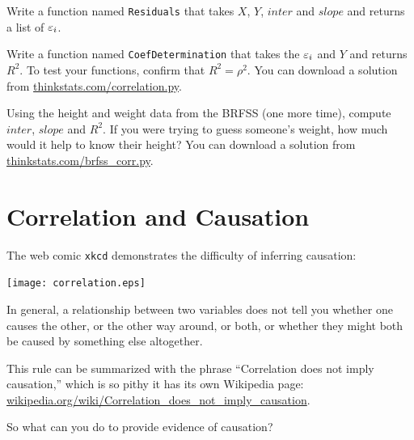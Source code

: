 \documentclass[12pt]{book}
\begin{document}
\begin{ex}

Write a function named {\tt Residuals} that takes $X$, $Y$, $inter$
and $slope$ and returns a list of $\varepsilon_i$.

Write a function named {\tt CoefDetermination} that takes the $\varepsilon_i$
and $Y$ and returns $R^2$.  To test your functions, confirm that $R^2
= \rho^2$.  You can download a solution
from \url{thinkstats.com/correlation.py}.

\end{ex}

\begin{ex}

Using the height and weight data from the BRFSS (one more time),
compute $inter$, $slope$ and $R^2$.  If you were trying to guess
someone's weight, how much would it help to know their height?
You can download a solution from
\url{thinkstats.com/brfss_corr.py}.

\end{ex}


\section{Correlation and Causation}

The web comic {\tt xkcd} demonstrates the difficulty of inferring
causation:

\vspace{0.1in}
\centerline{\texttt{[image: correlation.eps]}}

In general, a relationship between two variables does not tell you
whether one causes the other, or the other way around, or both, or
whether they might both be caused by something else altogether.

This rule can be summarized with the phrase ``Correlation
does not imply causation,'' which is so pithy it has its own
Wikipedia page: \url{wikipedia.org/wiki/Correlation_does_not_imply_causation}.

So what can you do to provide evidence of causation?
\end{document}
